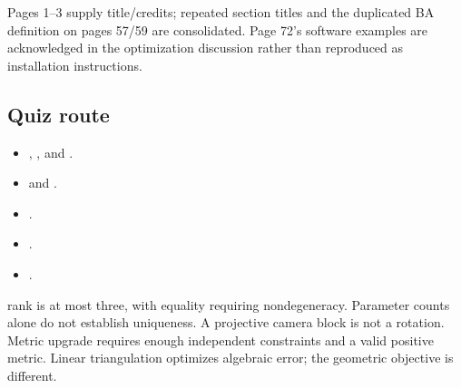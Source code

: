 \documentclass[letterpaper,11pt,english,openany,oneside]{jupyterBook}
\begin{document}
\sphinxAtStartPar
Pages 1–3 supply title/credits; repeated section titles and the duplicated BA definition on pages 57/59 are consolidated. Page 72’s software examples are acknowledged in the optimization discussion rather than reproduced as installation instructions.


\subsection{Quiz route}
\label{\detokenize{lectures/lecture06/review:quiz-route}}\begin{itemize}
\item {}
\sphinxAtStartPar
{\hyperref[\detokenize{lectures/lecture06/quiz-workbook:quiz-12-q1}]{}}, {\hyperref[\detokenize{lectures/lecture06/quiz-workbook:quiz-12-q2}]{}}, and {\hyperref[\detokenize{lectures/lecture06/quiz-workbook:quiz-12-q3}]{}}.

\item {}
\sphinxAtStartPar
{\hyperref[\detokenize{lectures/lecture06/quiz-workbook:quiz-16-q1}]{}} and {\hyperref[\detokenize{lectures/lecture06/quiz-workbook:quiz-16-q2}]{}}.

\item {}
\sphinxAtStartPar
{\hyperref[\detokenize{lectures/lecture06/quiz-workbook:quiz-a5-q1}]{}}.

\item {}
\sphinxAtStartPar
{\hyperref[\detokenize{lectures/lecture06/quiz-workbook:quiz-a6-q1}]{}}.

\item {}
\sphinxAtStartPar
{\hyperref[\detokenize{lectures/lecture06/quiz-workbook:quiz-a7-q1}]{}}.

\end{itemize}

\sphinxAtStartPar
{} rank is at most three, with equality requiring nondegeneracy. Parameter counts alone do not establish uniqueness. A projective camera block is not a rotation. Metric upgrade requires enough independent constraints and a valid positive metric. Linear triangulation optimizes algebraic error; the geometric objective is different.
\end{document}
